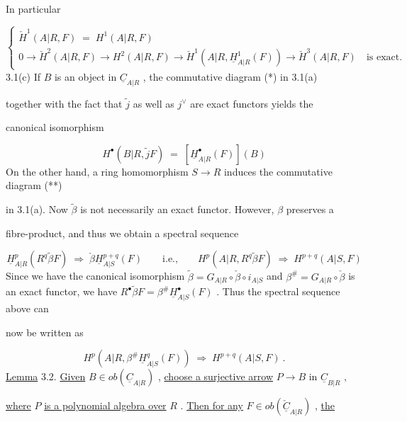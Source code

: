 In particular

\begin{equation*}
\left\{
\begin{array}{l}
\check{H}^{1}(A|R,F) \;=\; H^{1}(A|R,F) \\[2ex]
0 \to \check{H}^{2}(A|R,F) \to H^{2}(A|R,F) \to \check{H}^{1}(A|R,\underline{H}^{1}_{A|R}(F)) \to \check{H}^{3}(A|R,F) \quad \text{is exact.}
\end{array}
\right.
\end{equation*}
3.1(c)   If  $B$  is an object in  $\underline{C}_{A|R}$  , the commutative diagram (*) in 3.1(a)

together with the fact that  $\tilde{j}$  as well as  $j^{\vee}$  are exact functors yields the

canonical isomorphism

\begin{equation*}
H^{\bullet}(B|R,\tilde{j}F) \;=\; [\underline{H}^{\bullet}_{A|R}(F)](B)
\end{equation*}
On the other hand, a ring homomorphism  $S → R$  induces the commutative diagram (**)

in 3.1(a). Now  $\tilde{\beta}$  is not necessarily an exact functor. However,  $β$  preserves a

fibre-product, and thus we obtain a spectral sequence

\begin{equation*}
\underline{H}^{p}_{A|R}(R^{q}\tilde{\beta}F) \;\Rightarrow\; \check{\beta}\underline{H}^{p+q}_{A|S}(F) \qquad \text{i.e.,} \qquad H^{p}(A|R,R^{q}\tilde{\beta}F) \;\Rightarrow\; H^{p+q}(A|S,F)
\end{equation*}
Since we have the canonical isomorphism  $\tilde{\beta} = G_{A|R}\circ\check{\beta}\circ i_{A|S}$  and  $\beta^{\#} = G_{A|R}\circ\check{\beta}$  is an
exact functor, we have  $R^{\bullet}\tilde{\beta}F = \beta^{\#}\underline{H}^{\bullet}_{A|S}(F)$  . Thus the spectral sequence above can

now be written as

\begin{equation*}
H^{p}(A|R,\beta^{\#}\underline{H}^{q}_{A|S}(F)) \;\Rightarrow\; H^{p+q}(A|S,F) \ .
\end{equation*}
\underline{Lemma} 3.2.  \underline{Given}  $B \in ob(\underline{C}_{A|R})$  , \underline{choose a surjective arrow}  $P → B$  in  $\underline{C}_{B|R}$  ,

\underline{where}  $P$  \underline{is a polynomial algebra over}  $R$  . \underline{Then for any}  $F \in ob(\check{\underline{C}}_{A|R})$  , \underline{the}

